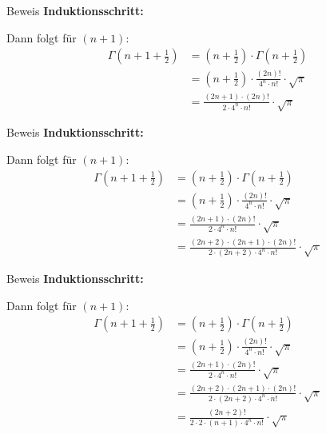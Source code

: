 \documentclass[10pt]{beamer}
\begin{document}
\begin{frame}{Beweis}
    \textbf{Induktionsschritt:}

    Dann folgt für \( \left( n + 1 \right) \):
    \begin{align*}
        \Gamma\left( n + 1 + \frac{1}{2} \right)
        & = \left( n + \frac{1}{2} \right) \cdot \Gamma\left( n + \frac{1}{2} \right) \\
        & = \left( n + \frac{1}{2} \right) \cdot \frac{\left( 2n \right)!}{4^{n} \cdot n!} \cdot \sqrt{\pi} \\
        & = \frac{\left( 2n + 1 \right) \cdot \left( 2n \right)!}{2 \cdot 4^{n} \cdot n!} \cdot \sqrt{\pi}
    \end{align*}
\end{frame}



\begin{frame}{Beweis}
    \textbf{Induktionsschritt:}

    Dann folgt für \( \left( n + 1 \right) \):
    \begin{align*}
        \Gamma\left( n + 1 + \frac{1}{2} \right)
        & = \left( n + \frac{1}{2} \right) \cdot \Gamma\left( n + \frac{1}{2} \right) \\
        & = \left( n + \frac{1}{2} \right) \cdot \frac{\left( 2n \right)!}{4^{n} \cdot n!} \cdot \sqrt{\pi} \\
        & = \frac{\left( 2n + 1 \right) \cdot \left( 2n \right)!}{2 \cdot 4^{n} \cdot n!} \cdot \sqrt{\pi} \\
        & = \frac{\left( 2n + 2 \right) \cdot \left( 2n + 1 \right) \cdot \left( 2n \right)!}{2 \cdot \left( 2n + 2 \right) \cdot 4^{n} \cdot n!} \cdot \sqrt{\pi}
    \end{align*}
\end{frame}



\begin{frame}{Beweis}
    \textbf{Induktionsschritt:}

    Dann folgt für \( \left( n + 1 \right) \):
    \begin{align*}
        \Gamma\left( n + 1 + \frac{1}{2} \right)
        & = \left( n + \frac{1}{2} \right) \cdot \Gamma\left( n + \frac{1}{2} \right) \\
        & = \left( n + \frac{1}{2} \right) \cdot \frac{\left( 2n \right)!}{4^{n} \cdot n!} \cdot \sqrt{\pi} \\
        & = \frac{\left( 2n + 1 \right) \cdot \left( 2n \right)!}{2 \cdot 4^{n} \cdot n!} \cdot \sqrt{\pi} \\
        & = \frac{\left( 2n + 2 \right) \cdot \left( 2n + 1 \right) \cdot \left( 2n \right)!}{2 \cdot \left( 2n + 2 \right) \cdot 4^{n} \cdot n!} \cdot \sqrt{\pi} \\
        & = \frac{\left( 2n + 2 \right)!}{2 \cdot 2 \cdot \left( n + 1 \right) \cdot 4^{n} \cdot n!} \cdot \sqrt{\pi}
    \end{align*}
\end{frame}
\end{document}
